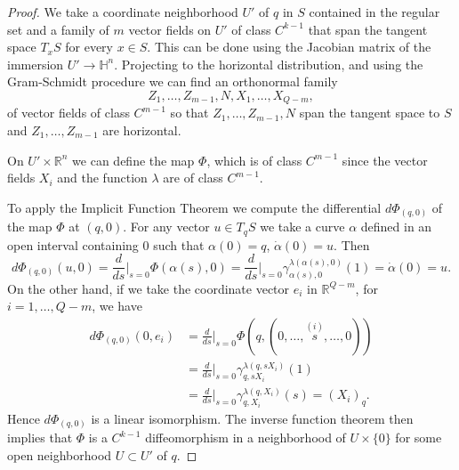 \documentclass[10pt]{amsart}
\theoremstyle{definition}
\theoremstyle{remark}
\numberwithin{equation}{section}
\begin{document}
\begin{proof}
We take a coordinate neighborhood $U'$ of $q$ in $S$ contained in the regular set and a family of $m$ vector fields on $U'$ of class $C^{k-1}$ that span the tangent space $T_xS$ for every $x\in S$. This can be done using the Jacobian matrix of the immersion $U'\to{{\mathbb{H}}}^n$. Projecting to the horizontal distribution, and using the Gram-Schmidt procedure we can find an orthonormal family
\[
Z_1,\ldots,Z_{m-1},N,X_1,\ldots,X_{Q-m},
\]
of vector fields of class $C^{m-1}$ so that $Z_1,\ldots,Z_{m-1},N$ span the tangent space to $S$ and $Z_1,\ldots,Z_{m-1}$ are horizontal.

On $U'\times{{\mathbb{R}}}^n$ we can define the map $\Phi$, which is of class $C^{m-1}$ since the vector fields $X_i$ and the function ${\lambda}$ are of class $C^{m-1}$.

To apply the Implicit Function Theorem we compute the differential $d\Phi_{(q,0)}$ of the map $\Phi$ at $(q,0)$. For any vector $u\in T_qS$ we take a curve $\alpha$ defined in an open interval containing $0$ such that $\alpha(0)=q$, $\dot{\alpha}(0)=u$. Then
\[
d\Phi_{(q,0)}(u,0)=\frac{d}{ds}\bigg|_{s=0}\Phi(\alpha(s),0)=\frac{d}{ds}\bigg|_{s=0}{\gamma}_{\alpha(s),0}^{{\lambda}(\alpha(s),0)}(1)=\dot{\alpha}(0)=u.
\]
On the other hand, if we take the coordinate vector $e_i$ in ${{\mathbb{R}}}^{Q-m}$, for $i=1,\ldots,Q-m$, we have
\begin{align*}
d\Phi_{(q,0)}(0,e_i)&=\frac{d}{ds}\bigg|_{s=0}\Phi(q,(0,\ldots,\stackrel{(i)}s,\ldots,0))
\\
&=\frac{d}{ds}\bigg|_{s=0}{\gamma}_{q,sX_i}^{{\lambda}(q,sX_i)}(1)
\\
&=
\frac{d}{ds}\bigg|_{s=0}{\gamma}_{q,X_i}^{{\lambda}(q,X_i)}(s)=(X_i)_q.
\end{align*}
Hence $d\Phi_{(q,0)}$ is a linear isomorphism. The inverse function theorem then implies that $\Phi$ is a $C^{k-1}$ diffeomorphism in a neighborhood of $U\times\{0\}$ for some open neighborhood $U\subset U'$ of $q$.
\end{proof}
\end{document}
